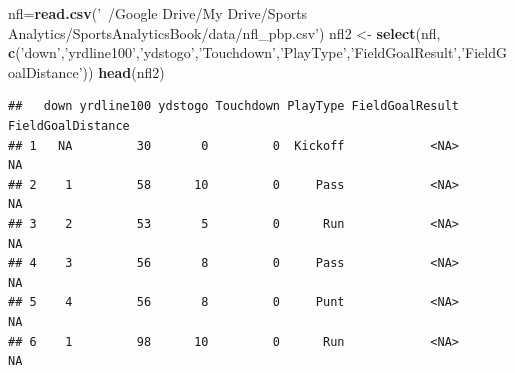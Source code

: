 \documentclass[]{article}
\newenvironment{Shaded}{\begin{snugshade}}{\end{snugshade}}
\newcommand{\CommentTok}[1]{\textcolor[rgb]{0.56,0.35,0.01}{\textit{#1}}}
\newcommand{\DataTypeTok}[1]{\textcolor[rgb]{0.13,0.29,0.53}{#1}}
\newcommand{\DecValTok}[1]{\textcolor[rgb]{0.00,0.00,0.81}{#1}}
\newcommand{\KeywordTok}[1]{\textcolor[rgb]{0.13,0.29,0.53}{\textbf{#1}}}
\newcommand{\NormalTok}[1]{#1}
\newcommand{\OperatorTok}[1]{\textcolor[rgb]{0.81,0.36,0.00}{\textbf{#1}}}
\newcommand{\StringTok}[1]{\textcolor[rgb]{0.31,0.60,0.02}{#1}}
\begin{document}
\begin{Shaded}
\begin{Highlighting}[]
\NormalTok{nfl=}\KeywordTok{read.csv}\NormalTok{(}\StringTok{'~/Google Drive/My Drive/Sports Analytics/SportsAnalyticsBook/data/nfl_pbp.csv'}\NormalTok{)}
\NormalTok{nfl2 <-}\StringTok{ }\KeywordTok{select}\NormalTok{(nfl, }\KeywordTok{c}\NormalTok{(}\StringTok{'down'}\NormalTok{,}\StringTok{'yrdline100'}\NormalTok{,}\StringTok{'ydstogo'}\NormalTok{,}\StringTok{'Touchdown'}\NormalTok{,}\StringTok{'PlayType'}\NormalTok{,}\StringTok{'FieldGoalResult'}\NormalTok{,}\StringTok{'FieldGoalDistance'}\NormalTok{))}
\KeywordTok{head}\NormalTok{(nfl2)}
\end{Highlighting}
\end{Shaded}

\begin{verbatim}
##   down yrdline100 ydstogo Touchdown PlayType FieldGoalResult FieldGoalDistance
## 1   NA         30       0         0  Kickoff            <NA>                NA
## 2    1         58      10         0     Pass            <NA>                NA
## 3    2         53       5         0      Run            <NA>                NA
## 4    3         56       8         0     Pass            <NA>                NA
## 5    4         56       8         0     Punt            <NA>                NA
## 6    1         98      10         0      Run            <NA>                NA
\end{verbatim}

\begin{Shaded}
\end{Shaded}
\end{document}
